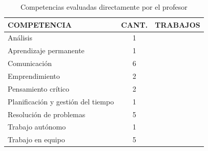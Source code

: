 \begin{table}
  \begin{center}
  \begin{tabular}{| m{6cm} | c | m{5cm} |}
    \hline
    COMPETENCIA & CANT. & TRABAJOS\\
    \hline
    \hline
    Análisis & 1 & \cite{aziz2007appraisal} \\
    \hline
    Aprendizaje permanente & 1 & \cite{rashid2008engineering} \\
    \hline
    Comunicación & 6 &  \cite{lacuesta2009active,martin2013acquired,rodriguez2010portfolio,benlloch2007adapting,yang2014fine,rashid2008engineering} \\
    \hline
    Emprendimiento & 2 & \cite{ward2011developing,rashid2008engineering} \\
    \hline
    Pensamiento crítico & 2 & \cite{lacuesta2009active,aziz2007appraisal} \\
    \hline
    Planificación y gestión del tiempo & 1 & \cite{lacuesta2009active} \\
    \hline
    Resolución de problemas & 5 & \cite{martin2013acquired,rodriguez2010portfolio,benlloch2007adapting,vizcarro2013assessment,aziz2007appraisal} \\
    \hline
    Trabajo autónomo & 1 &  \cite{lasa2013problem} \\
    \hline
    Trabajo en equipo & 5 &  \cite{lacuesta2009active,martin2013acquired,rodriguez2010portfolio,benlloch2007adapting,rashid2008engineering} \\
    \hline
  \end{tabular}
\end{center}
\caption{Competencias evaluadas directamente por el profesor}
\label{tab:CompetenciasProfesor}
\end{table}
 
